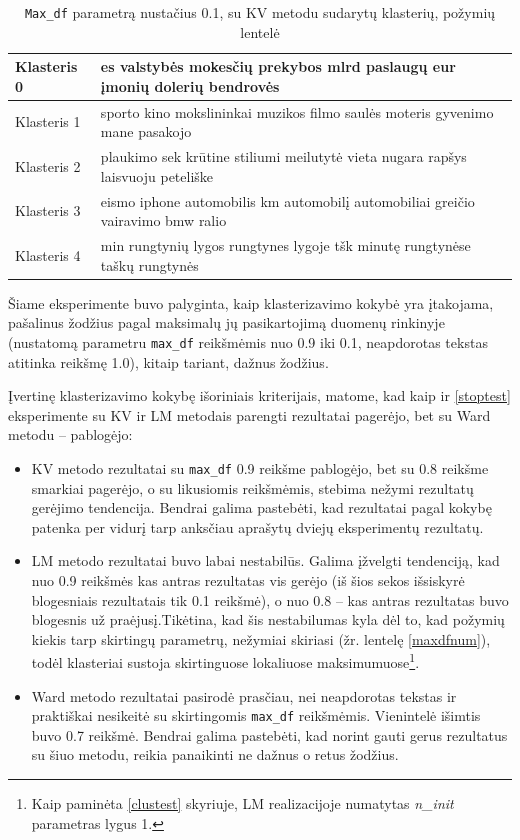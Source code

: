 \documentclass{VUMIFInfBakalaurinis}
\begin{document}
\begin{table}[H]
  \centering
  \caption{\texttt{Max\_df} parametrą nustačius 0.1, su KV metodu sudarytų klasterių,
  požymių lentelė}
  \small
  \begin{tabular}{|l|l|}
  \hline
  Klasteris 0 & es valstybės mokesčių prekybos mlrd paslaugų eur įmonių dolerių bendrovės       \\ \hline
  Klasteris 1 & sporto kino mokslininkai muzikos filmo saulės moteris gyvenimo mane pasakojo    \\ \hline
  Klasteris 2 & plaukimo sek krūtine stiliumi meilutytė vieta nugara rapšys laisvuoju peteliške \\ \hline
  Klasteris 3 & eismo iphone automobilis km automobilį automobiliai greičio vairavimo bmw ralio \\ \hline
  Klasteris 4 & min rungtynių lygos rungtynes lygoje tšk minutę rungtynėse taškų rungtynės      \\ \hline
  \end{tabular}
  \normalsize
\end{table}

Šiame eksperimente buvo palyginta, kaip klasterizavimo kokybė yra
įtakojama, pašalinus žodžius pagal maksimalų jų pasikartojimą duomenų
rinkinyje (nustatomą parametru \texttt{max\_df} reikšmėmis nuo 0.9 iki
0.1, neapdorotas tekstas atitinka reikšmę 1.0), kitaip tariant, dažnus
žodžius.

Įvertinę klasterizavimo kokybę išoriniais kriterijais, matome, kad kaip
ir \ref{stoptest}
eksperimente su KV ir LM metodais parengti rezultatai pagerėjo, bet su
Ward metodu -- pablogėjo:

\begin{itemize}
\item
  KV metodo rezultatai su \texttt{max\_df} 0.9 reikšme pablogėjo, bet su 0.8
  reikšme smarkiai pagerėjo, o su likusiomis reikšmėmis, stebima nežymi
  rezultatų gerėjimo tendencija. Bendrai galima pastebėti, kad
  rezultatai pagal kokybę patenka per vidurį tarp anksčiau aprašytų
  dviejų eksperimentų rezultatų.
\item
  LM metodo rezultatai buvo labai nestabilūs. Galima įžvelgti
  tendenciją, kad nuo 0.9 reikšmės kas antras rezultatas vis gerėjo (iš
  šios sekos išsiskyrė blogesniais rezultatais tik 0.1 reikšmė), o nuo
  0.8 -- kas antras rezultatas buvo blogesnis už praėjusį.Tikėtina, kad
  šis nestabilumas kyla dėl to, kad požymių kiekis tarp skirtingų
  parametrų, nežymiai skiriasi (žr. lentelę \ref{maxdfnum}), todėl klasteriai
  sustoja skirtinguose lokaliuose maksimumuose\footnote{Kaip paminėta
    \ref{clustest} skyriuje, LM realizacijoje
    numatytas \emph{n\_init} parametras lygus 1.}.
\item
  Ward metodo rezultatai pasirodė prasčiau, nei neapdorotas tekstas ir
  praktiškai nesikeitė su skirtingomis \texttt{max\_df} reikšmėmis. Vienintelė
  išimtis buvo 0.7 reikšmė. Bendrai galima pastebėti, kad norint gauti
  gerus rezultatus su šiuo metodu, reikia panaikinti ne dažnus o retus
  žodžius.
\end{itemize}
\end{document}

